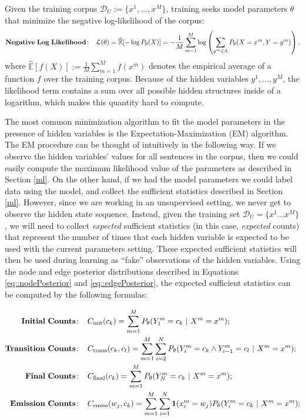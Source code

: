 Given the training corpus $\mathcal{D}_{U} := \{x^1, \ldots, x^M\}$, training 
seeks model parameters $\theta$ that minimize the negative log-likelihood of the corpus:
\begin{equation}
\label{loglikelihoood}
\mathbf{Negative\;Log\;Likelihood\!:}\;\;\;\; \mathcal{L}(\theta) = \widehat{\mathbb{E}} [-\log P_{\theta}(X)] = -\frac{1}{M}\sum_{m=1}^M \log \left( \sum_{y^m \in \Lambda} P_{\theta}(X=x^m,Y=y^m) \right),
\end{equation}
where $\widehat{\mathbb{E}}[f(X)] := \frac{1}{M}\sum_{m=1}^{M} f(x^m)$ denotes the empirical average of a function $f$ over the training corpus. Because of the hidden variables $y^1,\ldots,y^M$, the likelihood term contains a
sum over all possible hidden structures inside of a logarithm, which
makes this quantity hard to compute.

The most common minimization
algorithm to fit the model parameters in the presence of hidden
variables is the Expectation-Maximization (EM) algorithm. 
The EM procedure can be thought of intuitively in the following way. 
If we observe the hidden variables' values for all sentences in the
corpus, then we could easily compute the maximum likelihood value of
the parameters as described in Section \ref{ml}. 
On the other hand, if we had the model parameters we could label data
using the model, and collect the
sufficient statistics described in Section \ref{ml}.
However, since we are working in an unsupervised setting, we never get to
observe the hidden state sequence. Instead, given the 
training set $\mathcal{D}_{U} = \{x^1 \ldots x^M\}$, we will need to
collect \emph{expected} sufficient statistics (in this case, \emph{expected} counts) 
that
represent the number of times that each hidden variable is
expected to be used with the current parameters setting. These expected sufficient
statistics will then be used during learning as ``fake'' observations of
the hidden variables. Using the node and edge posterior distributions
described in Equations \ref{eq::nodePosterior} and \ref{eq::edgePosterior},
the expected sufficient statistics can 
be computed by the following formulas:

\begin{align}
\mathbf{Initial \ Counts\!:}\;\;\;\;  &  C_{\mathrm{init}}(c_k) = \sum_{m=1}^M
P_{\theta} (Y^m_1 = c_k \,\,|\,\, X^m = x^m); \label{eq::initialCountsPost}\\
%
%
\mathbf{Transition \ Counts\!:}\;\;\;\;  &  C_{\mathrm{trans}}(c_k,c_l) =
\sum_{m=1}^M  \sum_{i = 2}^{N}
P_{\theta}(Y^m_i = c_k \wedge Y^m_{i-1} = c_l \,\,|\,\, X^m = x^m); \label{eq::transitionCountsPost}\\
%
\mathbf{Final \ Counts\!:}\;\;\;\;  &  C_{\mathrm{final}}(c_k) = \sum_{m=1}^M
P_{\theta} (Y^m_N = c_k \,\,|\,\, X^m = x^m); \label{eq::finalCountsPost}\\
%
\mathbf{Emission \ Counts\!:}\;\;\;\;  &  
C_{\mathrm{emiss}}(w_j,c_k) = \sum_{m=1}^M
\sum_{i = 1}^{N}
\Ind (x^m_i = w_j) P_{\theta}(Y^m_i = c_k \,\,|\,\, X^m = x^m); \label{eq::emissionCountsPost}
\end{align}

